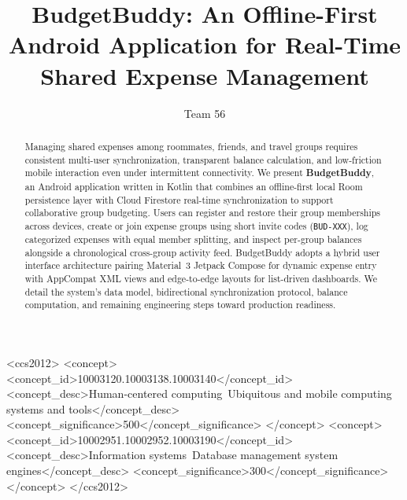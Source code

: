 \documentclass[sigconf,nonacm]{acmart}
\begin{document}
\title{BudgetBuddy: An Offline-First Android Application for Real-Time Shared Expense Management}

\author{Team 56}

\begin{abstract}
Managing shared expenses among roommates, friends, and travel groups requires consistent multi-user synchronization, transparent balance calculation, and low-friction mobile interaction even under intermittent connectivity. We present \textbf{BudgetBuddy}, an Android application written in Kotlin that combines an offline-first local Room persistence layer with Cloud Firestore real-time synchronization to support collaborative group budgeting. Users can register and restore their group memberships across devices, create or join expense groups using short invite codes (\texttt{BUD-XXX}), log categorized expenses with equal member splitting, and inspect per-group balances alongside a chronological cross-group activity feed. BudgetBuddy adopts a hybrid user interface architecture pairing Material~3 Jetpack Compose for dynamic expense entry with AppCompat XML views and edge-to-edge layouts for list-driven dashboards. We detail the system's data model, bidirectional synchronization protocol, balance computation, and remaining engineering steps toward production readiness.
\end{abstract}

\begin{CCSXML}
<ccs2012>
   <concept>
       <concept_id>10003120.10003138.10003140</concept_id>
       <concept_desc>Human-centered computing~Ubiquitous and mobile computing systems and tools</concept_desc>
       <concept_significance>500</concept_significance>
   </concept>
   <concept>
       <concept_id>10002951.10002952.10003190</concept_id>
       <concept_desc>Information systems~Database management system engines</concept_desc>
       <concept_significance>300</concept_significance>
   </concept>
</ccs2012>
\end{CCSXML}



\maketitle
\end{document}
